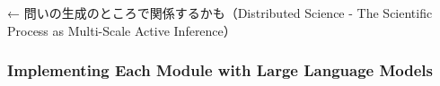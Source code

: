 ← 問いの生成のところで関係するかも（Distributed Science - The Scientific Process as Multi-Scale Active Inference）



\subsubsection{Implementing Each Module with Large Language Models}

